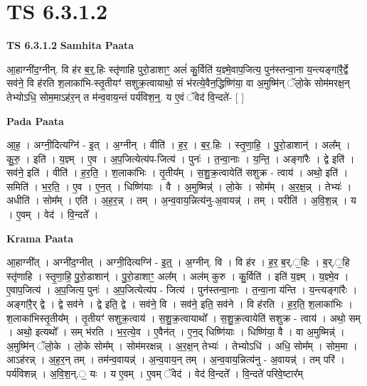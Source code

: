 \documentclass[17pt]{extarticle}
\begin{document}
\section{ TS 6.3.1.2 }

\textbf{TS 6.3.1.2 } \newline
\textbf{Samhita Paata} \newline

आ॒हाग्नी॑द॒ग्नीन्. वि ह॑र ब॒र्॒.हिः स्तृ॑णाहि पुरो॒डाशाꣳ॒॒ अलं॑ कु॒र्विति॑ य॒ज्ञ्मे॒वाप॒जित्य॒ पुन॑स्तन्वा॒ना य॒न्त्यङ्गा॑रै॒र्द्वे सव॑ने॒ वि ह॑रति श॒लाका॑भि-स्तृ॒तीयꣳ॑ सशुक्र॒त्वायाथो॒ सं भ॑रत्ये॒वैन॒द्धिष्णि॑या॒ वा अ॒मुष्मि॑न् ॅलो॒के सोम॑मरक्ष॒न् तेभ्योऽधि॒ सोम॒माऽह॑र॒न् त म॑न्व॒वाय॒न्तं पर्य॑विश॒न्॒. य ए॒वं ॅवेद॑ वि॒न्दते॑- [  ] \newline

\textbf{Pada Paata} \newline

आ॒ह॒ । अग्नी॒दित्यग्नि॑ - इ॒त् । अ॒ग्नीन् । वीति॑ । ह॒र॒ । ब॒र॒.हिः । स्तृ॒णा॒हि॒ । पु॒रो॒डाशान्॑ । अल᳚म् । कु॒रु॒ । इति॑ । य॒ज्ञ्म् । ए॒व । अ॒प॒जित्येत्य॑प-जित्य॑ । पुनः॑ । त॒न्वा॒नाः । य॒न्ति॒ । अङ्गा॑रैः । द्वे इति॑ । सव॑ने॒ इति॑ । वीति॑ । ह॒र॒ति॒ । श॒लाका॑भिः । तृ॒तीय᳚म् । स॒शु॒क्र॒त्वायेति॑ सशुक्र - त्वाय॑ । अथो॒ इति॑ । समिति॑ । भ॒र॒ति॒ । ए॒व । ए॒न॒त् । धिष्णि॑याः । वै । अ॒मुष्मिन्न्॑ । लो॒के । सोम᳚म् । अ॒र॒क्ष॒न्न् । तेभ्यः॑ । अधीति॑ । सोम᳚म् । एति॑ । अ॒ह॒र॒न्न् । तम् । अ॒न्व॒वाय॒न्नित्य॑नु-अ॒वायन्न्॑ । तम् । परीति॑ । अ॒वि॒श॒न्न् । य । ए॒वम् । वेद॑ । वि॒न्दते᳚ ।  \newline


\textbf{Krama Paata} \newline

आ॒हाग्नी᳚त् । अग्नी॑द॒ग्नीत् । अग्नी॒दित्यग्नि॑ - इ॒त्॒ । अ॒ग्नीन्. वि । वि ह॑र । ह॒र॒ ब॒र्.॒हिः । ब॒र्.॒हि स्तृ॑णाहि । स्तृ॒णा॒हि॒ पु॒रो॒डाशान्॑ । पु॒रो॒डाशाꣳ॒॒ अल᳚म् । अल॑म् कुरु । कु॒र्विति॑ । इति॑ य॒ज्ञ्म् । य॒ज्ञ्मे॒व । ए॒वाप॒जित्य॑ । अ॒प॒जित्य॒ पुनः॑ । अ॒प॒जित्येत्य॑प - जित्य॑ । पुन॑स्तन्वा॒नाः । त॒न्वा॒ना य॑न्ति । य॒न्त्यङ्‍गा॑रैः । अङ्‍गा॑रै॒र् द्वे । द्वे सव॑ने । द्वे इति॒ द्वे । सव॑ने॒ वि । सव॑ने॒ इति॒ सव॑ने । वि ह॑रति । ह॒र॒ति॒ श॒लाका॑भिः । श॒लाका॑भिस्तृ॒तीय᳚म् । तृ॒तीयꣳ॑ सशुक्र॒त्वाय॑ । स॒शु॒क्र॒त्वायाथो᳚ । स॒शु॒क्र॒त्वायेति॑ सशुक्र - त्वाय॑ । अथो॒ सम् । अथो॒ इत्यथो᳚ । सम् भ॑रति । भ॒र॒त्ये॒व । ए॒वैन॑त् । ए॒न॒द् धिष्णि॑याः । धिष्णि॑या॒ वै । वा अ॒मुष्मिन्न्॑ । अ॒मुष्मि॑न् ॅलो॒के । लो॒के सोम᳚म् । सोम॑मरक्षन्न् । अ॒र॒क्ष॒न् तेभ्यः॑ । तेभ्योऽधि॑ । अधि॒ सोम᳚म् । सोम॒मा । आऽह॑रन्न् । 
अ॒ह॒र॒न् तम् । तम॑न्व॒वायन्न्॑ । अ॒न्व॒वाय॒न् तम् । अ॒न्व॒वाय॒न्नित्य॑नु - अ॒वायन्न्॑ । तम् परि॑ । पर्य॑विशन्न् । अ॒वि॒श॒न्.॒ यः । य ए॒वम् । ए॒वम् ॅवेद॑ । वेद॑ वि॒न्दते᳚ । वि॒न्दते॑ परिवे॒ष्टार᳚म् \newline
\end{document}
